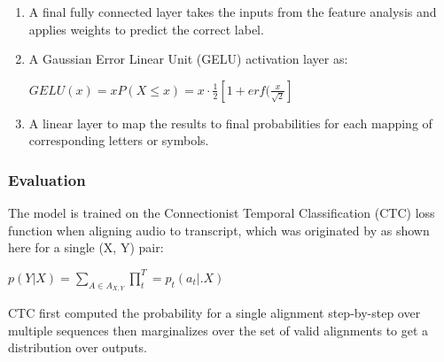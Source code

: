 \begin{enumerate}[start=1,label={\bfseries\arabic*:}]
    
    \item A final fully connected layer takes the inputs from the feature analysis and applies weights to predict the correct label.
    
    \item A Gaussian Error Linear Unit (GELU) activation layer as: 
    
    \begin{center}
    $GELU(x) = xP(X \leq x) = x \cdot \frac{1}{2} [1 + erf(\frac{x}{\sqrt{2}}]$
    \end{center}
    
    \item A linear layer to map the results to final probabilities for each mapping of corresponding letters or symbols. 
    
\end{enumerate}



\subsubsection{Evaluation}

The model is trained on the Connectionist Temporal Classification (CTC) loss function when aligning audio to transcript, which was originated by \cite{CTC} as shown here for a single (X, Y) pair: 
\begin{center}
$p(Y | X) = \sum_{A\in A_{X, Y}} \prod_t^T = p_t(a_t |. X)$    
\end{center}

CTC first computed the probability for a single alignment step-by-step over multiple sequences then marginalizes over the set of valid alignments to get a distribution over outputs.  